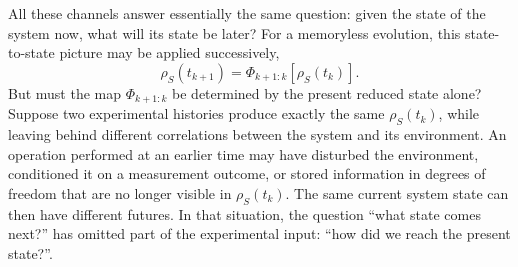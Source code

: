 All these channels answer essentially the same question: given the state of the system now, what will its state be later?
For a memoryless evolution, this state-to-state picture may be applied successively,
%
\begin{equation}
    \rho_S(t_{k+1})
    = \Phi_{k+1:k}[\rho_S(t_k)].
    \label{eq:stepwise-channel-picture}
\end{equation}
%
But must the map \(\Phi_{k+1:k}\) be determined by the present reduced state alone?
Suppose two experimental histories produce exactly the same \(\rho_S(t_k)\), while leaving behind different correlations between the system and its environment.
An operation performed at an earlier time may have disturbed the environment, conditioned it on a measurement outcome, or stored information in degrees of freedom that are no longer visible in \(\rho_S(t_k)\).
The same current system state can then have different futures.
In that situation, the question ``what state comes next?'' has omitted part of the experimental input: ``how did we reach the present state?''.

